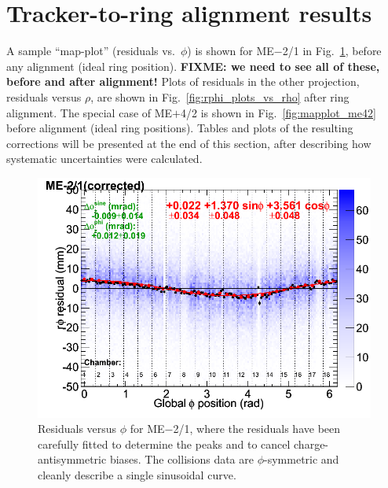 \documentclass[12pt]{article}
\begin{document}
\section{Tracker-to-ring alignment results}

A sample ``map-plot'' (residuals vs.\ $\phi$) is shown for ME$-$2/1 in
Fig.~\ref{fig:one_and_only_mapplot}, before any alignment (ideal ring
position).  {\bf FIXME: we need to see all of these, before and after
  alignment!}  Plots of residuals in the other projection, residuals
versus $\rho$, are shown in Fig.~\ref{fig:rphi_plots_vs_rho} after
ring alignment.  The special case of ME$+$4/2 is shown in
Fig.~\ref{fig:mapplot_me42} before alignment (ideal ring positions).
Tables and plots of the resulting corrections will be presented at the
end of this section, after describing how systematic uncertainties
were calculated.

\begin{figure}
\begin{center}
\includegraphics[height=6 cm]{one_and_only_mapplot.png}
\end{center}

\caption{Residuals versus $\phi$ for ME$-$2/1, where the residuals
  have been carefully fitted to determine the peaks and to cancel
  charge-antisymmetric biases.  The collisions data are
  $\phi$-symmetric and cleanly describe a single sinusoidal
  curve. \label{fig:one_and_only_mapplot}}
\end{figure}
\end{document}
